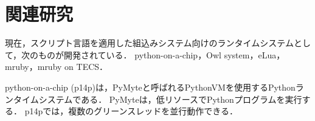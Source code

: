 \documentclass[submit,techrep]{ipsj}
\begin{document}
\section{関連研究}
\vspace{-2mm}
\label{sec:Related Work}
現在，スクリプト言語を適用した組込みシステム向けのランタイムシステムとして，次のものが開発されている．
python-on-a-chip\cite{url:python-on-a-chip}，Owl system\cite{par:owl}，eLua\cite{url:eLua}，mruby\cite{par:mruby}，mruby on TECS\cite{par:mrubyonTECS}．

python-on-a-chip (p14p)は，PyMyteと呼ばれるPythonVMを使用するPythonランタイムシステムである．
PyMyteは，低リソースでPythonプログラムを実行する．
p14pでは，複数のグリーンスレッドを並行動作できる．
\end{document}
